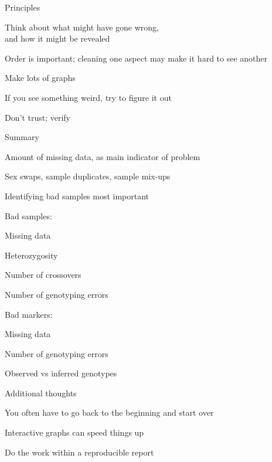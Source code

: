 \documentclass[aspectratio=169,12pt,t]{beamer}
\begin{document}
\begin{frame}[c]{Principles}

  \bbi
\item Think about what might have gone wrong, \\
  and how it might be revealed

 \item Order is important; cleaning one aspect may make it hard to see
   another

 \item Make lots of graphs

 \item If you see something weird, try to figure it out

 \item Don't trust; verify

   \ei

\note{
}

\end{frame}






\begin{frame}[c]{Summary}

  \bbi
\item Amount of missing data, as main indicator of problem
\item Sex swaps, sample duplicates, sample mix-ups
\item Identifying bad samples most important
\item Bad samples:
  \bi
\item Missing data
\item Heterozygosity
\item Number of crossovers
\item Number of genotyping errors
  \ei
\item Bad markers:
  \bi
\item Missing data
\item Number of genotyping errors
\item Observed vs inferred genotypes
  \ei
  \ei

\note{
}

\end{frame}




\begin{frame}[c]{Additional thoughts}

  \bbi
\item You often have to go back to the beginning and start over
\item Interactive graphs can speed things up
\item Do the work within a reproducible report
  \ei

\note{
}

\end{frame}
\end{document}
